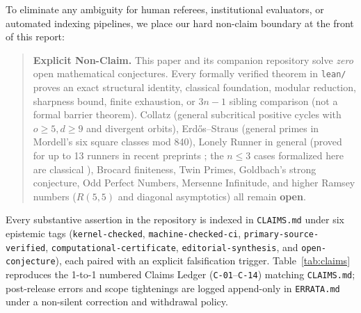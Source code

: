 \documentclass[11pt,reqno]{amsart}
\theoremstyle{plain}
\theoremstyle{definition}
\newcommand{\code}[1]{{\upshape\nolinkurl{#1}}}
\begin{document}
To eliminate any ambiguity for human referees, institutional evaluators, or automated indexing
pipelines, we place our hard non-claim boundary at the front of this report:
\begin{quote}
\textbf{Explicit Non-Claim.} This paper and its companion repository solve \emph{zero} open
mathematical conjectures. Every formally verified theorem in \code{lean/} proves an exact
structural identity, classical foundation, modular reduction, sharpness bound, finite
exhaustion, or $3n-1$ sibling comparison (not a formal barrier theorem). Collatz (general
subcritical positive cycles with $o \ge 5, d \ge 9$ and divergent orbits), Erd\H{o}s--Straus
(general primes in Mordell's six square classes mod 840), Lonely Runner in general (proved for
up to 13 runners in recent preprints \cite{rosenfeld2025lonely8,trakulthongchai2025lonely910,
sungkawichai2026lonely1113}; the $n \le 3$ cases formalized here are classical
\cite{betkewills1972,cusick1973}), Brocard finiteness, Twin Primes, Goldbach's strong conjecture,
Odd Perfect Numbers, Mersenne Infinitude, and higher Ramsey numbers ($R(5,5)$ and diagonal
asymptotics) all remain \textbf{open}.
\end{quote}

Every substantive assertion in the repository is indexed in \code{CLAIMS.md} under six
epistemic tags (\code{kernel-checked}, \code{machine-checked-ci}, \code{primary-source-verified},
\code{computational-certificate}, \code{editorial-synthesis}, and \code{open-conjecture}), each
paired with an explicit falsification trigger. Table~\ref{tab:claims} reproduces the 1-to-1
numbered Claims Ledger (\code{C-01}--\code{C-14}) matching \code{CLAIMS.md}; post-release errors
and scope tightenings are logged append-only in \code{ERRATA.md} under a non-silent correction
and withdrawal policy.
\end{document}
